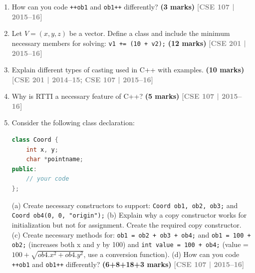 \documentclass[12pt,a3paper]{article}
\newcommand{\yr}[1]{\hfill\textcolor{gray}{\small\textbf{[#1]}}}
\newcommand{\mk}[1]{\textcolor{orange!70!black}{\small\textbf{(#1 marks)}}}
\begin{document}
\begin{enumerate}




\item How can you code \texttt{++ob1} and \texttt{ob1++} differently? \mk{3}
\yr{CSE 107 | 2015--16}




\item Let $V = (x, y, z)$ be a vector. Define a class and include the minimum necessary members for solving: \texttt{v1 += (10 + v2);} \mk{12}
\yr{CSE 201 | 2015--16}






\item Explain different types of casting used in C++ with examples. \mk{10}
\yr{CSE 201 | 2014--15; CSE 107 | 2015--16}




\item Why is RTTI a necessary feature of C++? \mk{5}
\yr{CSE 107 | 2015--16}





\item Consider the following class declaration:
\begin{lstlisting}[language=C++]
class Coord {
    int x, y;
    char *pointname;
public:
    // your code
};
\end{lstlisting}
(a) Create necessary constructors to support: \texttt{Coord ob1, ob2, ob3;} and \texttt{Coord ob4(0, 0, "origin");}
(b) Explain why a copy constructor works for initialization but not for assignment. Create the required copy constructor.
(c) Create necessary methods for: \texttt{ob1 = ob2 + ob3 + ob4;} and \texttt{ob1 = 100 + ob2;} (increases both x and y by 100) and \texttt{int value = 100 + ob4;} (value = $100 + \sqrt{ob4.x^2 + ob4.y^2}$, use a conversion function).
(d) How can you code \texttt{++ob1} and \texttt{ob1++} differently?
\mk{6+8+18+3}
\yr{CSE 107 | 2015--16}





\end{enumerate}
\end{document}
